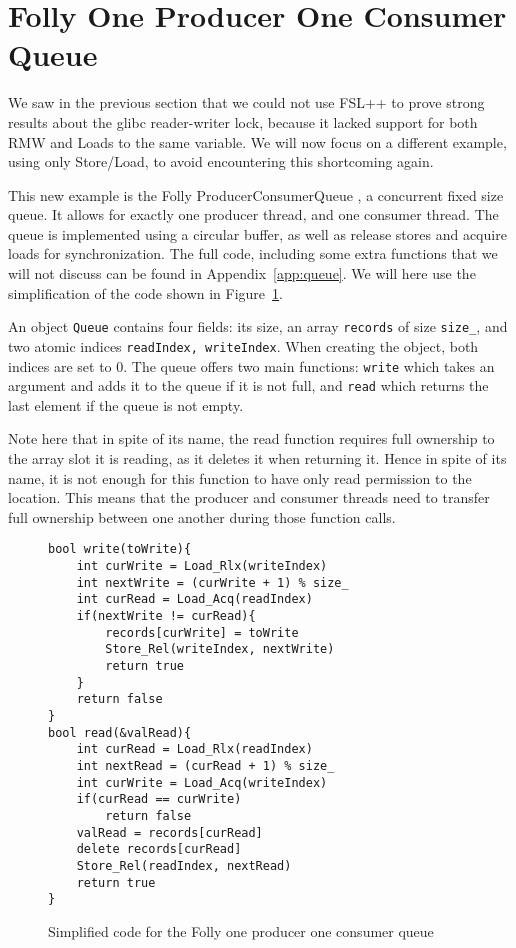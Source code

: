 \section{Folly One Producer One Consumer Queue}

We saw in the previous section that we could not use FSL++ to prove strong results about the glibc reader-writer lock, because it lacked support for both RMW and Loads to the same variable. We will now focus on a different example, using only Store/Load, to avoid encountering this shortcoming again.

This new example is the Folly ProducerConsumerQueue \cite{queue}, a concurrent fixed size queue. It allows for exactly one producer thread, and one consumer thread. The queue is implemented using a circular buffer, as well as release stores and acquire loads for synchronization. The full code, including some extra functions that we will not discuss can be found in Appendix~\ref{app:queue}. We will here use the simplification of the code shown in Figure~\ref{fig:queueCyclic}.

An object \texttt{Queue} contains four fields: its size, an array \texttt{records} of size \texttt{size\_}, and two atomic indices \texttt{readIndex, writeIndex}. When creating the object, both indices are set to $0$. The queue offers two main functions: \texttt{write} which takes an argument and adds it to the queue if it is not full, and \texttt{read} which returns the last element if the queue is not empty. 

Note here that in spite of its name, the read function requires full ownership to the array slot it is reading, as it deletes it when returning it. Hence in spite of its name, it is not enough for this function to have only read permission to the location. This means that the producer and consumer threads need to transfer full ownership between one another during those function calls.

\begin{figure}
\begin{lstlisting}
bool write(toWrite){
	int curWrite = Load_Rlx(writeIndex)
	int nextWrite = (curWrite + 1) % size_
	int curRead = Load_Acq(readIndex)
	if(nextWrite != curRead){
		records[curWrite] = toWrite
		Store_Rel(writeIndex, nextWrite)
		return true
	}
	return false
}
bool read(&valRead){
	int curRead = Load_Rlx(readIndex)
	int nextRead = (curRead + 1) % size_
	int curWrite = Load_Acq(writeIndex)
	if(curRead == curWrite)
		return false
	valRead = records[curRead]
	delete records[curRead]
	Store_Rel(readIndex, nextRead)
	return true
}

\end{lstlisting}
		\caption{Simplified code for the Folly one producer one consumer queue}
		\label{fig:queueCyclic}
\end{figure}

